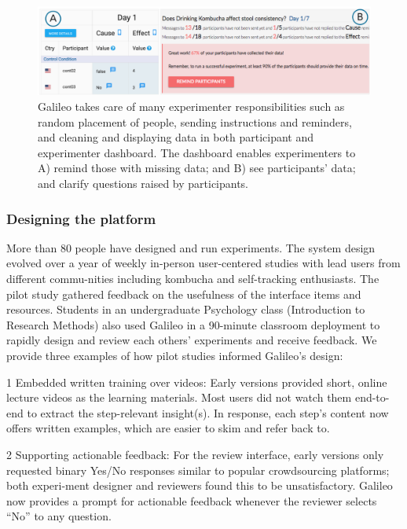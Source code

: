 \begin{figure}[t] 
  \centering
  \includegraphics[width=1.0\textwidth]{figures/galileo/galileo-2-run-1}
  \caption[Galileo takes care of many experimenter responsibilities such as random placement of people, sending instructions and reminders, and cleaning and displaying data in both participant and experimenter dashboard]
{Galileo takes care of many experimenter responsibilities such as random placement of people, sending instructions and reminders, and cleaning and displaying data in both participant and experimenter dashboard. The dashboard enables experimenters to A) remind those with missing data; and B) see participants’ data; and clarify questions raised by participants.}
  \label{fig:galileo-2-run-1}
\end{figure}
 

\subsubsection{Designing the platform}
More than 80 people have designed and run experiments. The system design evolved over a year of weekly in-person user-centered studies with lead users from different commu-nities including kombucha and self-tracking enthusiasts. The pilot study gathered feedback on the usefulness of the interface items and resources. Students in an undergraduate Psychology class (Introduction to Research Methods) also used Galileo in a 90-minute classroom deployment to rapidly design and review each others’ experiments and receive feedback. We provide three examples of how pilot studies informed Galileo’s design:

1 Embedded written training over videos: Early versions provided short, online lecture videos as the learning materials. Most users did not watch them end-to-end to extract the step-relevant insight(s). In response, each step’s content now offers written examples, which are easier to skim and refer back to. 

2 Supporting actionable feedback: For the review interface, early versions only requested binary Yes/No responses similar to popular crowdsourcing platforms; both experi-ment designer and reviewers found this to be unsatisfactory. Galileo now provides a prompt for actionable feedback whenever the reviewer selects “No” to any question. 

